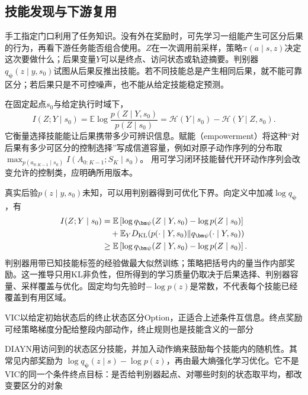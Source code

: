 \subsection{技能发现与下游复用}
\label{sec:rl-learning-skill-discovery}

手工指定门口利用了任务知识。没有外在奖励时，可先学习一组能产生可区分后果的行为，再看下游任务能否组合使用。$Z$在一次调用前采样，策略$\pi(a\mid s,z)$决定这次要做什么；后果变量$Y$可以是终点、访问状态或轨迹摘要。判别器$q_{\bm\psi}(z\mid y,s_0)$试图从后果反推出技能。若不同技能总是产生相同后果，就不能可靠区分；若后果只是不可控噪声，也不能从给定技能稳定预测。

\begin{definition}[互信息与赋能的控制含义]
  \label{def:rl-learning-empowerment}
  在固定起点$s_0$与给定执行时域下，
  \[
    I(Z;Y\mid s_0)
      =\mathbb E\log\frac{p(Z\mid Y,s_0)}{p(Z\mid s_0)}
      =\mathcal H(Y\mid s_0)-\mathcal H(Y\mid Z,s_0).
  \]
  它衡量选择技能能让后果携带多少可辨识信息。赋能（empowerment）将这种“对后果有多少可区分的控制选择”写成信道容量，例如对原子动作序列的分布取
  $\max_{p(a_{0:K-1}\mid s_0)}I(A_{0:K-1};S_K\mid s_0)$。
  用可学习闭环技能替代开环动作序列会改变允许的控制类，应明确所用版本。
\end{definition}

真实后验$p(z\mid y,s_0)$未知，可以用判别器得到可优化下界。向定义中加减$\log q_{\bm\psi}$，有
\begin{align}
 I(Z;Y\mid s_0)
   &=\mathbb E\left[\log q_{\bm\psi}(Z\mid Y,s_0)
                                  -\log p(Z\mid s_0)\right]\notag\\
   &\quad+\mathbb E_Y D_{\mathrm{KL}}
       (p(\cdot\mid Y,s_0)\|q_{\bm\psi}(\cdot\mid Y,s_0))\notag\\
   &\geq\mathbb E\left[\log q_{\bm\psi}(Z\mid Y,s_0)
                                  -\log p(Z\mid s_0)\right].
 \label{eq:rl-learning-skill-mi}
\end{align}
判别器用带已知技能标签的经验做最大似然训练；策略把括号内的量当作内部奖励。这一推导只用KL非负性，但所得到的学习质量仍取决于后果选择、判别器容量、采样覆盖与优化。固定均匀先验时$-\log p(z)$是常数，不代表每个技能已经覆盖到有用区域。

VIC以给定初始状态后的终止状态区分Option，正适合上述条件互信息。终点奖励可经策略梯度分配给整段内部动作，终止规则也是技能含义的一部分

DIAYN用访问到的状态区分技能，并加入动作熵来鼓励每个技能内的随机性。其常见内部奖励为
$\log q_{\bm\psi}(z\mid s)-\log p(z)$，再由最大熵强化学习优化。它不是VIC的同一个条件终点目标：是否给判别器起点、对哪些时刻的状态取平均，都改变要区分的对象

